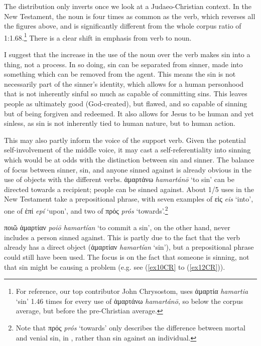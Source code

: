 \documentclass[output=paper,colorlinks,citecolor=brown]{langscibook}
\begin{document}
The distribution only inverts once we look at a Judaeo-Christian context. 
In
the New Testament, the noun is four times as common as the verb, which
reverses all the figures above, and is significantly different from the
whole corpus ratio of 1:1.68.\footnote{For reference, our top
  contributor John Chrysostom, uses ἁμαρτία \textit{hamartia} ‘sin' 1.46 times for every use of
  ἁμαρτάνω \textit{hamartánō}, so below the corpus average, but before the pre-Christian
  average.} There is a clear shift in emphasis from verb to noun.


I suggest that the increase in the use of the noun over the verb makes
sin into a thing, not a process. 
In so doing, sin can be separated from
sinner, made into something which can be removed from the agent. 
This
means the sin is not necessarily part of the sinner's identity, which
allows for a human personhood that is not inherently sinful so much as
capable of committing sins. 
This leaves people as ultimately good
(God-created), but flawed, and so capable of sinning but of being
forgiven and redeemed.
It also allows for Jesus to be human and yet
sinless, as sin is not inherently tied to human nature, but to human
action.

This may also partly inform the voice of the support verb. 
Given the
potential self-involvement of the middle voice, it may cast a
self-referentiality into sinning which would be at odds with the
distinction between sin and sinner. 
The balance of focus between sinner,
sin, and anyone sinned against is already obvious in the use of objects
with the different verbs. ἁμαρτάνω \textit{hamartánō} ‘to sin' can be directed towards a recipient;
people can be sinned against. 
About 1/5 uses in the New Testament take a
prepositional phrase, with seven examples of εἰς \textit{eis} ‘into', one of
ἐπί \textit{epí} ‘upon', and two of πρός \textit{prós} ‘towards'.\footnote{Note that
  πρός \textit{prós} ‘towards' only describes the difference between mortal and venial sin, in , rather than sin against an individual.}

ποιῶ ἁμαρτίαν \textit{poiō hamartían} ‘to commit a sin', on the other hand, never includes a person sinned
against. 
This is partly due to the fact that the verb already has a
direct object (ἁμαρτίαν \textit{hamartían} ‘sin'), but a prepositional phrase could still have
been used. 
The focus is on the fact that someone is sinning, not that
sin might be causing a problem (e.g. see (\ref{ex10CR} to (\ref{ex12CR})).
\end{document}
